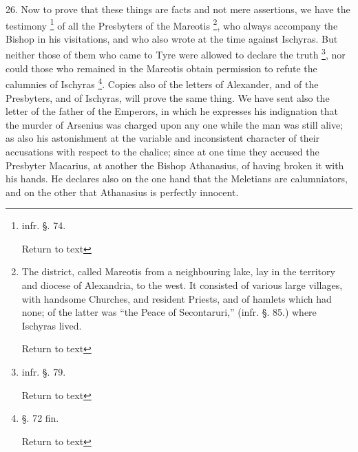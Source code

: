 26. Now to prove that these things are facts and
not mere assertions, we have the testimony \footnote{infr. §. 74.

Return to text} of all the Presbyters of the Mareotis \footnote{The district, called Mareotis from a neighbouring lake, lay in the
territory and diocese of Alexandria, to the west. It consisted of
various large villages, with handsome Churches, and resident Priests,
and of hamlets which had none; of the latter was ``the Peace of
Secontaruri,'' (infr. §. 85.) where Ischyras lived.

Return to text}, who always accompany the Bishop in his visitations, and who
also wrote at the time against Ischyras. But neither those of them who
came to Tyre were allowed to declare the truth \footnote{infr. §. 79.

Return to text}, nor could those who remained in the Mareotis obtain
permission to refute the calumnies of Ischyras \footnote{§. 72 fin.

Return to text}. Copies also of the letters of Alexander, and of the
Presbyters, and of Ischyras, will prove the same thing. We have sent
also the letter of the father of the Emperors, in which he expresses
his indignation that the murder of Arsenius was charged upon any one
while the man was still alive; as also his astonishment at the
variable and inconsistent character of their accusations with respect
to the chalice; since at one time they accused the Presbyter Macarius,
at another the Bishop Athanasius, of having broken it with his hands.
He declares also on the one hand that the Meletians are calumniators,
and on the other that Athanasius is perfectly innocent.

